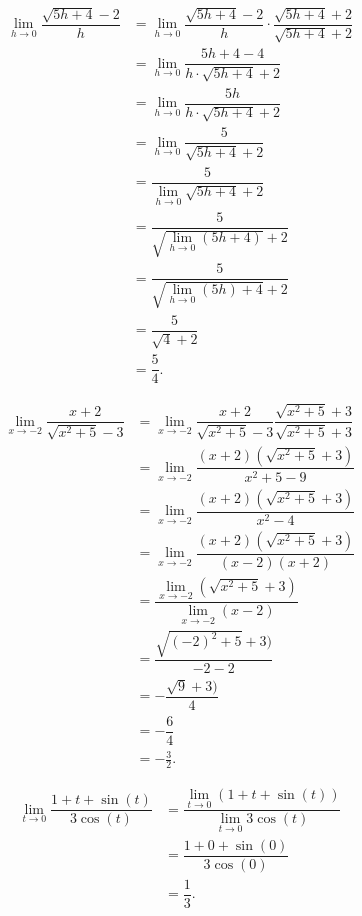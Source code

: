 \documentclass{hwset}
\begin{document}
\be
	\item \begin{solution}
		\begin{align*}
			\lim_{h\to 0}\dfrac{\sqrt{5h+4}-2}{h} 
				&= \lim_{h\to 0}\dfrac{\sqrt{5h+4}-2}{h} \cdot \dfrac{\sqrt{5h + 4} +
					2}{\sqrt{5h + 4} + 2} \\ 
			&= \lim_{h\to 0} \dfrac{5h + 4 - 4}{h\cdot \sqrt{5h+4} + 2} \\
			&= \lim_{h\to 0} \dfrac{5h}{h\cdot \sqrt{5h+4} + 2} \\
			&= \lim_{h\to 0} \dfrac{5}{\sqrt{5h+4} + 2} \\
			&= \dfrac{5}{\lim_{h\to 0} \sqrt{5h+4} + 2} \\
			&= \dfrac{5}{\sqrt{\lim_{h\to 0}\left(5h+4\right)} + 2} \\
			&= \dfrac{5}{\sqrt{\lim_{h\to 0}\left(5h\right)+4} + 2} \\
			&= \dfrac{5}{\sqrt{4} + 2} \\
			&= \boxed{\dfrac{5}{4}.}
		\end{align*}
	\end{solution}
	\item \begin{solution}
		\begin{align*}
		\lim_{x\to -2}\dfrac{x+2}{\sqrt{x^2+5}-3} 
			&= \lim_{x\to -2}\dfrac{x+2}{\sqrt{x^2+5}-3}
				\dfrac{\sqrt{x^2+5}+3}{\sqrt{x^2+5}+3} \\
		&= \lim_{x\to -2}\dfrac{(x+2)(\sqrt{x^2+5}+3)}{x^2+5-9} \\
		&= \lim_{x\to -2}\dfrac{(x+2)(\sqrt{x^2+5}+3)}{x^2-4} \\
		&= \lim_{x\to -2}\dfrac{(x+2)(\sqrt{x^2+5}+3)}{(x-2)(x+2)} \\
		&= \dfrac{\lim_{x\to -2}(\sqrt{x^2+5}+3)}{\lim_{x\to -2}(x-2)} \\
		&= \dfrac{\sqrt{(-2)^2+5}+3)}{-2-2} \\
		&= -\dfrac{\sqrt{9}+3)}{4} \\
		&= -\dfrac{6}{4} \\
		&= \boxed{-\frac{3}{2}.}
		\end{align*}
	\end{solution}
	\item \begin{solution}
		\begin{align*}
			\lim_{t\to 0}\dfrac{1+t+\sin(t)}{3\cos(t)} 
				&= \dfrac{\lim_{t\to 0}\left(1+t+\sin(t)\right)}{\lim_{t\to 0} 3\cos(t)} \\
			&= \dfrac{1+0+\sin(0)}{3\cos(0)} \\
			&= \boxed{\dfrac{1}{3}.}
		\end{align*}
	\end{solution}
\end{document}
